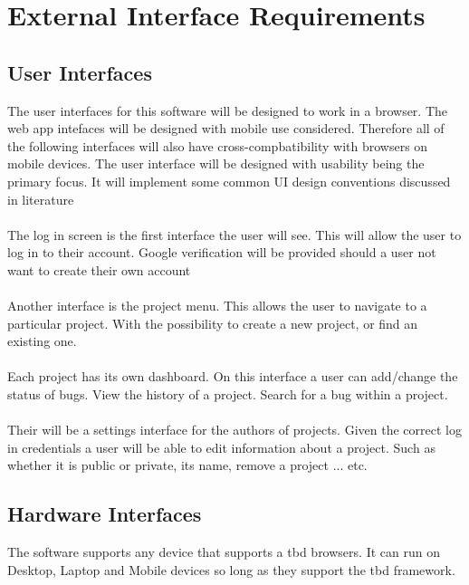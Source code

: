 \documentclass{article}
\newcommand{\comment}[1]{}
\begin{document}
\section{External Interface Requirements}
\subsection{User Interfaces}
\comment{
	Describe the logical characteristics of each interface between the software product and users. This may include smaple screen images, any GUI standards or product family style guides that are to be followed, screen layout contraints, standard buttons and functions (e.g., help) that will appear on every screen, keyboard shortcuts, error message display standards, and so on. Define the software components for which a user interface is needed. Details of the user interface should be documented in a seperate user interface specification.
	}
The user interfaces for this software will be designed to work in a browser. The web app intefaces will be designed with mobile use considered. Therefore all of the following interfaces will also have cross-compbatibility with browsers on mobile devices. The user interface will be designed with usability being the primary focus. It will implement some common UI design conventions discussed in literature \parencite{aboutface14}
\\ \\
The log in screen is the first interface the user will see. This will allow the user to log in to their account. Google verification will be provided should a user not want to create their own account
\\ \\
Another interface is the project menu. This allows the user to navigate to a particular project. With the possibility to create a new project, or find an existing one.
\\ \\
Each project has its own dashboard. On this interface a user can add/change the status of bugs. View the history of a project. Search for a bug within a project.
\\ \\
Their will be a settings interface for the authors of projects. Given the correct log in credentials a user will be able to edit information about a project. Such as whether it is public or private, its name, remove a project ... etc.
\subsection{Hardware Interfaces}
\comment{
Describe the logical and physical characteristics of each interface between the software product and the hardware components of the system. This may include the supported device types, the communication protocols to be used.
	}
The software supports any device that supports a \acrshort{tbd} browsers. It can run on Desktop, Laptop and Mobile devices so long as they support the \acrshort{tbd} framework.
\end{document}
